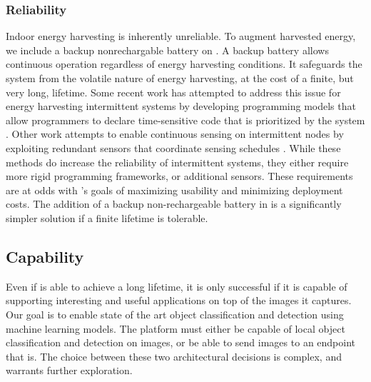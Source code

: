 \subsubsection{Reliability}
Indoor energy harvesting is inherently unreliable.
To augment harvested energy, we include a backup nonrechargable battery on \name. A backup battery allows continuous operation regardless of energy harvesting conditions. It safeguards the system from the volatile nature of energy harvesting, at the cost of a finite, but very long, lifetime.
Some recent work has attempted to address this issue for energy harvesting intermittent systems by developing programming models that allow programmers to declare time-sensitive code that is prioritized by the system \cite{maeng2020adaptive}. Other work attempts to enable continuous sensing on intermittent nodes by exploiting redundant sensors that coordinate sensing schedules \cite{majid2020continuous}. While these methods do increase the reliability of intermittent systems, they either require more rigid programming frameworks, or additional sensors. These requirements are at odds with \name's goals of maximizing usability and minimizing deployment costs.
The addition of a backup non-rechargeable battery in \name is a significantly simpler solution if a finite lifetime is tolerable.

\subsection{Capability}
Even if \name is able to achieve a long lifetime, it is only successful if it is capable of supporting interesting and useful applications on top of the images it captures.  Our goal is to enable state of the art object classification and detection using machine learning models. The platform must either be capable of local object classification and detection on images, or be able to send images to an endpoint that is. The choice between these two architectural decisions is complex, and warrants further exploration.

